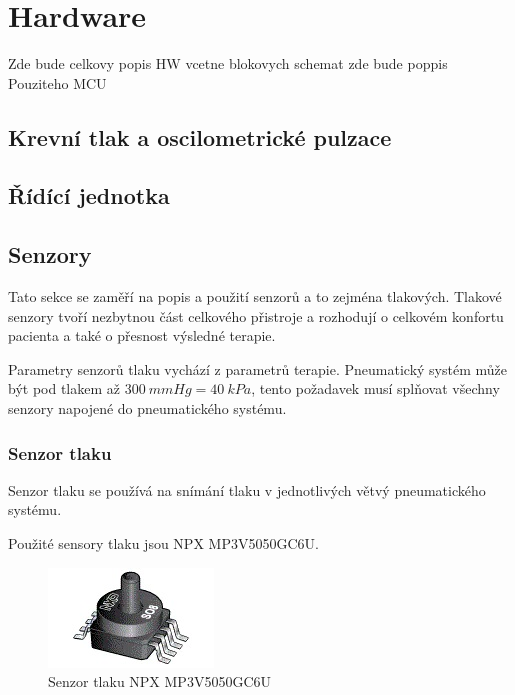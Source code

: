 \chapter{Hardware}
Zde bude celkovy popis HW vcetne blokovych schemat
zde bude poppis Pouziteho MCU

\section{Krevní tlak a oscilometrické pulzace}

\section{Řídící jednotka}



\section{Senzory}
Tato sekce se zaměří na popis a použití senzorů a to zejména tlakových. Tlakové senzory tvoří nezbytnou část celkového přistroje a rozhodují o celkovém konfortu pacienta a také o přesnost výsledné terapie. \par
Parametry senzorů tlaku vychází z parametrů terapie. Pneumatický systém může být pod tlakem až $300 \ mmHg = 40 \ kPa$, tento požadavek musí splňovat všechny senzory napojené do pneumatického systému.

\subsection{Senzor tlaku}
Senzor tlaku se používá na snímání tlaku v jednotlivých větvý pneumatického systému. \par


Použité sensory tlaku jsou NPX MP3V5050GC6U. 

\begin{figure}[H]
    \centering
    \includegraphics{pictures/nxp_sensor.jpg}
    \caption{Senzor tlaku NPX MP3V5050GC6U}
    \label{fig:nxp}
\end{figure}

